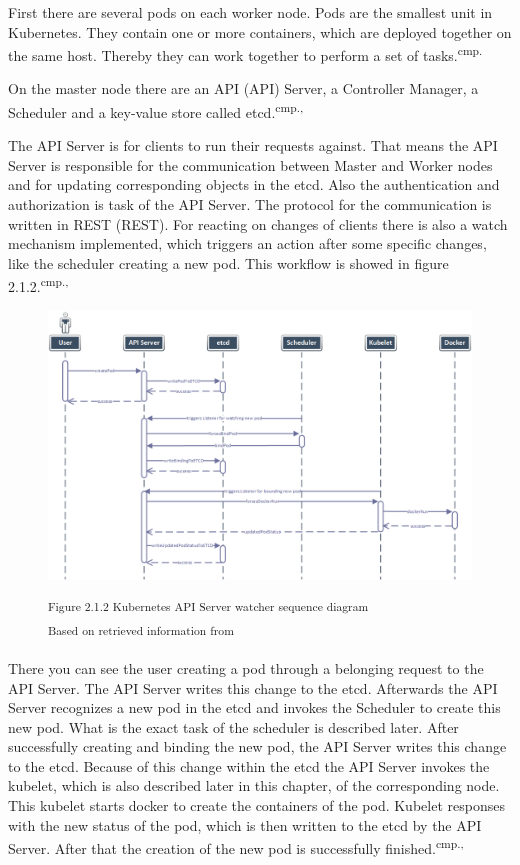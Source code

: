 First there are several pods on each worker node. Pods are the smallest unit in Kubernetes. They contain one or more containers, which are deployed together on the same host. Thereby they can work together to perform a set of tasks.\textsuperscript{cmp.\cite{15}}%

On the master node there are an \acs{API} (\acl{API}) Server, a Controller Manager, a Scheduler and a key-value store called etcd.\textsuperscript{cmp.\cite{13}, \cite{16}}

The API Server is for clients to run their requests against. That means the API Server is responsible for the communication between Master and Worker nodes and for updating corresponding objects in the etcd. Also the authentication and authorization is task of the API Server. The protocol for the communication is written in \acs{REST} (\acl{REST}). For reacting on changes of clients there is also a watch mechanism implemented, which triggers an action after some specific changes, like the scheduler creating a new pod. This workflow is showed in figure 2.1.2.\textsuperscript{cmp.\cite{13}, \cite{16}}

\begin{figure}[h]
\centering
\includegraphics[width=\textwidth]{images/kubernetes_watcher_sequence.png}

\textsuperscript{Figure 2.1.2 Kubernetes API Server watcher sequence diagram}\\
\textsuperscript{Based on retrieved information from \cite{16}}
\end{figure}

There you can see the user creating a pod through a belonging request to the API Server. The API Server writes this change to the etcd. Afterwards the API Server recognizes a new pod in the etcd and invokes the Scheduler to create this new pod. What is the exact task of the scheduler is described later. After successfully creating and binding the new pod, the API Server writes this change to the etcd. Because of this change within the etcd the API Server invokes the kubelet, which is also described later in this chapter, of the corresponding node. This kubelet starts docker to create the containers of the pod. Kubelet responses with the new status of the pod, which is then written to the etcd by the API Server. After that the creation of the new pod is successfully finished.\textsuperscript{cmp.\cite{13}, \cite{16}}

